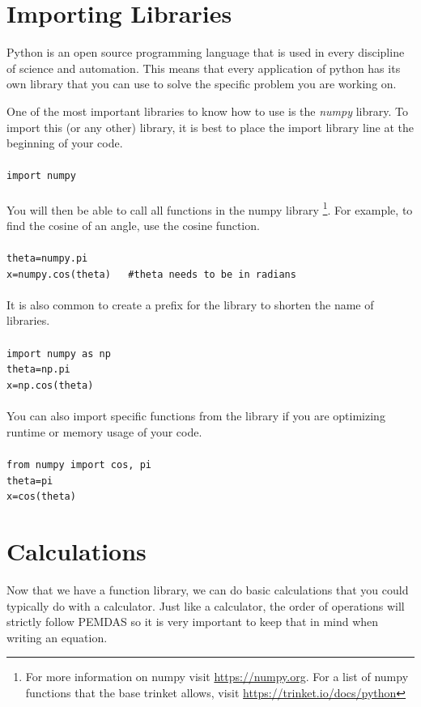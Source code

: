 \documentclass{article}
\begin{document}
\section{Importing Libraries}
Python is an open source programming language that is used in every discipline of science and automation. This means that every application of python has its own library that you can use to solve the specific problem you are working on. 

One of the most important libraries to know how to use is the \textit{numpy} library. To import this (or any other) library, it is best to place the import library line at the beginning of your code.
\\ \\
\verb|import numpy|
\\ \\
You will then be able to call all functions in the numpy library \footnote{For more information on numpy visit \url{https://numpy.org}. For a list of numpy functions that the base trinket allows, visit \url{https://trinket.io/docs/python}}. 
For example, to find the cosine of an angle, use the cosine function.
\\ \\
\verb|theta=numpy.pi|\\
\verb|x=numpy.cos(theta)   #theta needs to be in radians|
\\ \\
It is also common to create a prefix for the library to shorten the name of libraries. 
\\ \\ 
\verb|import numpy as np|
\\
\verb|theta=np.pi|
\\
\verb|x=np.cos(theta) |
\\ \\
You can also import specific functions from the library if you are optimizing runtime or memory usage of your code.
\\ \\
\verb|from numpy import cos, pi|
\\
\verb|theta=pi|
\\
\verb|x=cos(theta)|

\section{Calculations}
Now that we have a function library, we can do basic calculations that you could typically do with a calculator. Just like a calculator, the order of operations will strictly follow PEMDAS so it is very important to keep that in mind when writing an equation. 
\end{document}
